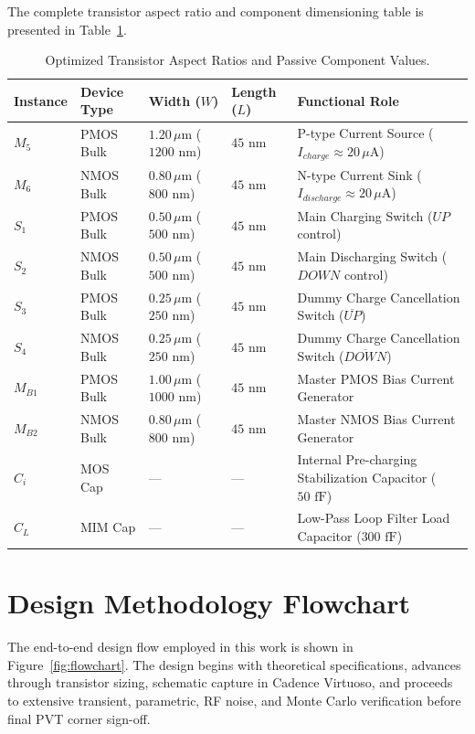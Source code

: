 \documentclass[11pt,a4paper]{report}
\begin{document}
The complete transistor aspect ratio and component dimensioning table is presented in Table~\ref{tab:sizing_table}.

\begin{table}[H]
    \centering
    \caption{Optimized Transistor Aspect Ratios and Passive Component Values.}
    \label{tab:sizing_table}
    \begin{tabularx}{\textwidth}{llllX}
        \toprule
        \textbf{Instance} & \textbf{Device Type} & \textbf{Width ($W$)} & \textbf{Length ($L$)} & \textbf{Functional Role} \\
        \midrule
        $M_5$ & PMOS Bulk & $1.20\,\mu\text{m}$ ($1200\text{ nm}$) & $45\text{ nm}$ & P-type Current Source ($I_{charge} \approx 20\,\mu\text{A}$) \\
        $M_6$ & NMOS Bulk & $0.80\,\mu\text{m}$ ($800\text{ nm}$) & $45\text{ nm}$ & N-type Current Sink ($I_{discharge} \approx 20\,\mu\text{A}$) \\
        $S_1$ & PMOS Bulk & $0.50\,\mu\text{m}$ ($500\text{ nm}$) & $45\text{ nm}$ & Main Charging Switch ($UP$ control) \\
        $S_2$ & NMOS Bulk & $0.50\,\mu\text{m}$ ($500\text{ nm}$) & $45\text{ nm}$ & Main Discharging Switch ($DOWN$ control) \\
        $S_3$ & PMOS Bulk & $0.25\,\mu\text{m}$ ($250\text{ nm}$) & $45\text{ nm}$ & Dummy Charge Cancellation Switch ($\overline{UP}$) \\
        $S_4$ & NMOS Bulk & $0.25\,\mu\text{m}$ ($250\text{ nm}$) & $45\text{ nm}$ & Dummy Charge Cancellation Switch ($\overline{DOWN}$) \\
        $M_{B1}$ & PMOS Bulk & $1.00\,\mu\text{m}$ ($1000\text{ nm}$) & $45\text{ nm}$ & Master PMOS Bias Current Generator \\
        $M_{B2}$ & NMOS Bulk & $0.80\,\mu\text{m}$ ($800\text{ nm}$) & $45\text{ nm}$ & Master NMOS Bias Current Generator \\
        $C_i$ & MOS Cap & --- & --- & Internal Pre-charging Stabilization Capacitor ($50\text{ fF}$) \\
        $C_L$ & MIM Cap & --- & --- & Low-Pass Loop Filter Load Capacitor ($300\text{ fF}$) \\
        \bottomrule
    \end{tabularx}
\end{table}

\section{Design Methodology Flowchart}
The end-to-end design flow employed in this work is shown in Figure~\ref{fig:flowchart}. The design begins with theoretical specifications, advances through transistor sizing, schematic capture in Cadence Virtuoso, and proceeds to extensive transient, parametric, RF noise, and Monte Carlo verification before final PVT corner sign-off.
\end{document}
